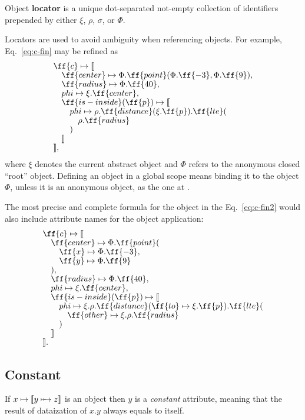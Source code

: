 \begin{definition}\label{def:locator}
Object \textbf{locator} is a unique dot-separated not-empty
collection of identifiers prepended by either \(\xi\), \(\rho\), \(\sigma\), or \(\Phi\).
\end{definition}

Locators are used to avoid ambiguity when referencing objects.
For example, Eq.~\ref{eq:c-fin} may be refined as
\begin{equation}
\begin{split}
& \ff{c} \mapsto \llbracket \br
& \quad \ff{center} \mapsto \Phi.\ff{point}(\Phi.\ff{-3}, \Phi.\ff{9}), \br
& \quad \ff{radius} \mapsto \Phi.\ff{40}, \br
& \quad \varphi \mapsto \xi.\ff{center}, \br
& \quad \ff{is-inside}(\ff{p}) \mapsto \llbracket \br
& \quad \quad \varphi \mapsto \rho.\ff{distance}(\xi.\ff{p}).\ff{lte}( \br
& \quad \quad \quad \rho.\ff{radius} \br
& \quad \quad ) \br
& \quad \rrbracket \br
& \rrbracket,
\end{split}
\end{equation}
where \(\xi\) denotes the current abstract object
and \(\Phi\) refers to the anonymous closed ``root'' object.
Defining an object in a global scope
means binding it to the object \(\Phi\), unless it is an anonymous
object, as the one at .

The most precise and complete formula for the object in the
Eq.~\ref{eq:c-fin2} would also include attribute names for
the object application:
\begin{equation}
\begin{split}
& \ff{c} \mapsto \llbracket \br
& \quad \ff{center} \mapsto \Phi.\ff{point}( \br
& \quad \quad \ff{x} \mapsto \Phi.\ff{-3}, \br
& \quad \quad \ff{y} \mapsto \Phi.\ff{9} \br
& \quad ), \br
& \quad \ff{radius} \mapsto \Phi.\ff{40}, \br
& \quad \varphi \mapsto \xi.\ff{center}, \br
& \quad \ff{is-inside}(\ff{p}) \mapsto \llbracket \br
& \quad \quad \varphi \mapsto \xi.\rho.\ff{distance}(\ff{to} \mapsto \xi.\ff{p}).\ff{lte}( \br
& \quad \quad \quad \ff{other} \mapsto \xi.\rho.\ff{radius} \br
& \quad \quad ) \br
& \quad \rrbracket \br
& \rrbracket.
\end{split}
\end{equation}

\subsection{Constant}

\newcommand\cmapsto{\mapstochar\relbar\mathrel{\mkern-8mu}\mapsto}
\begin{definition}\label{def:identity}
If \(x \mapsto \llbracket y \cmapsto z \rrbracket\) is an object
then \(y\) is a \emph{constant} attribute, meaning that
the result of dataization of \(x.y\) always equals to itself.
\end{definition}

